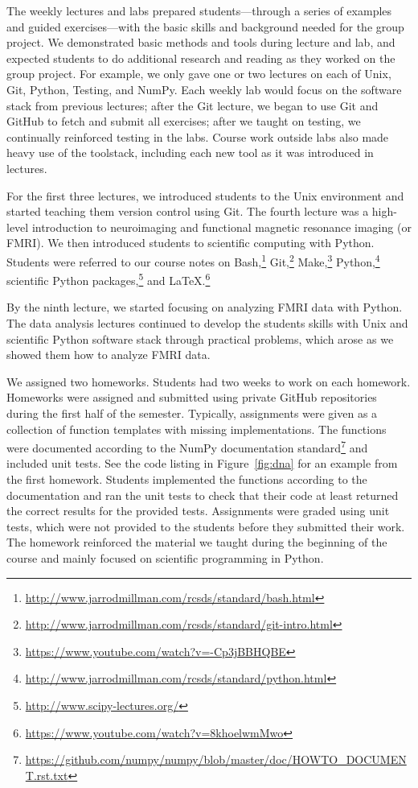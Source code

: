The weekly lectures and labs prepared students---through a
series of examples and guided exercises---with the basic skills and
background needed for the group project.
We demonstrated basic methods and tools during lecture and lab,
and expected students to do additional research and reading as they worked on
the group project.
For example, we only gave one or two lectures on each of Unix, Git, Python,
Testing, and NumPy.
Each weekly lab would focus on the software stack from previous lectures;
after the Git lecture, we began to use Git and GitHub to fetch and submit all
exercises;
after we taught on testing, we continually reinforced testing in the labs.
Course work outside labs also made heavy use of the toolstack, including each
new tool as it was introduced in lectures.

For the first three lectures, we introduced students to the Unix environment
and started teaching them version control using Git.
The fourth lecture was a high-level introduction to neuroimaging and
functional magnetic resonance imaging (or FMRI).
We then introduced students to scientific computing with Python.
Students were referred to our course notes on
Bash,\footnote{\url{http://www.jarrodmillman.com/rcsds/standard/bash.html}}
Git,\footnote{\url{http://www.jarrodmillman.com/rcsds/standard/git-intro.html}}
Make,\footnote{\url{https://www.youtube.com/watch?v=-Cp3jBBHQBE}}
Python,\footnote{\url{http://www.jarrodmillman.com/rcsds/standard/python.html}}
scientific Python packages,\footnote{\url{http://www.scipy-lectures.org/}}
and \LaTeX.\footnote{\url{https://www.youtube.com/watch?v=8khoelwmMwo}}

By the ninth lecture, we started focusing on analyzing FMRI data with Python.
The data analysis lectures continued to develop the students skills with
Unix and scientific Python software stack through practical problems,
which arose as we showed them how to analyze FMRI data.

We assigned two homeworks.
Students had two weeks to work on each homework.
Homeworks were assigned and submitted using private GitHub repositories  during
the first half of the semester.
Typically, assignments were given as a collection of function templates with
missing implementations.
The functions were documented according to the NumPy documentation
standard\footnote{\url{https://github.com/numpy/numpy/blob/master/doc/HOWTO_DOCUMENT.rst.txt}}
and included unit tests.
See the code listing in Figure~\ref{fig:dna} for an example from the first homework.
Students implemented the functions according to the documentation
and ran the unit tests to check that their code at least
returned the correct results for the provided tests.
Assignments were graded using unit tests, which were not provided to
the students before they submitted their work.
The homework reinforced the material we taught during the
beginning of the course and mainly focused on scientific programming
in Python.


